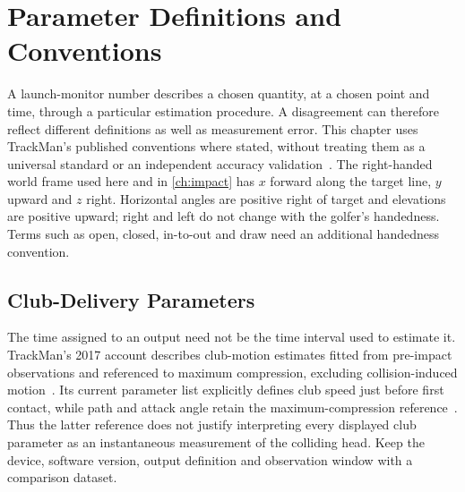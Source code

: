 \chapter{Parameter Definitions and Conventions}
\label{ch:params}
\nocite{perfectgolfswing}

A launch-monitor number describes a chosen quantity, at a chosen point and time, through a particular estimation procedure.
A disagreement can therefore reflect different definitions as well as measurement error.
This chapter uses TrackMan's published conventions where stated, without treating them as a universal standard or an independent accuracy validation~\cite{trackman40params,trackmanclubdata,trackmanparameterdefinitions}.
The right-handed world frame used here and in \cref{ch:impact} has $x$ forward along the target line, $y$ upward and $z$ right.
Horizontal angles are positive right of target and elevations are positive upward; right and left do not change with the golfer's handedness.
Terms such as open, closed, in-to-out and draw need an additional handedness convention.

\section{Club-Delivery Parameters}
\label{sec:clubparams}

The time assigned to an output need not be the time interval used to estimate it.
TrackMan's 2017 account describes club-motion estimates fitted from pre-impact observations and referenced to maximum compression, excluding collision-induced motion~\cite{trackmanclubdata}.
Its current parameter list explicitly defines club speed just before first contact, while path and attack angle retain the maximum-compression reference~\cite{trackmanparameterdefinitions,trackmanclubspeed}.
Thus the latter reference does not justify interpreting every displayed club parameter as an instantaneous measurement of the colliding head.
Keep the device, software version, output definition and observation window with a comparison dataset.

